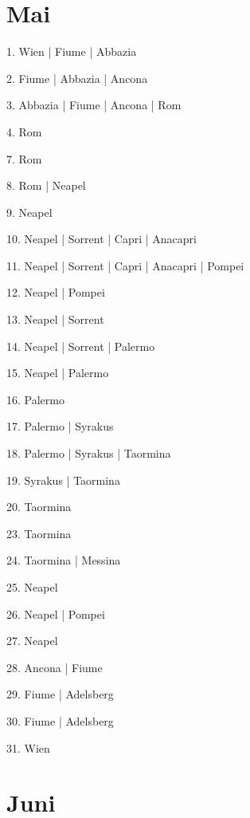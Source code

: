 \documentclass[twoside=false,titlepage=false,open=any, parskip=never, fontsize=10pt, headings=small, chapterprefix=false, appendixprefix=false, DIV=15]{scrbook}
\begin{document}
\begin{multicols}{3}
            \section*{Mai}
            1. Wien | Fiume | Abbazia\par
            2. Fiume | Abbazia | Ancona\par
            3. Abbazia | Fiume | Ancona | Rom\par
            4. Rom\par
            7. Rom\par
            8. Rom | Neapel\par
            9. Neapel\par
            10. Neapel | Sorrent | Capri | Anacapri\par
            11. Neapel | Sorrent | Capri | Anacapri | Pompei\par
            12. Neapel | Pompei\par
            13. Neapel | Sorrent\par
            14. Neapel | Sorrent | Palermo\par
            15. Neapel | Palermo\par
            16. Palermo\par
            17. Palermo | Syrakus\par
            18. Palermo | Syrakus | Taormina\par
            19. Syrakus | Taormina\par
            20. Taormina\par
            23. Taormina\par
            24. Taormina | Messina\par
            25. Neapel\par
            26. Neapel | Pompei\par
            27. Neapel\par
            28. Ancona | Fiume\par
            29. Fiume | Adelsberg\par
            30. Fiume | Adelsberg\par
            31. Wien\par
            \section*{Juni}

\end{multicols}
\end{document}
